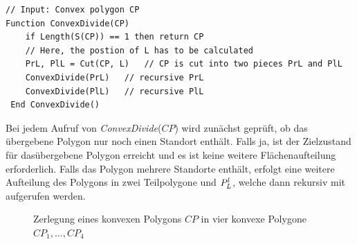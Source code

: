 \documentclass[ngerman]{seminarbeitrag}
\begin{document}
\begin{lstlisting}[float,caption={Die Grundidee hinter dem Algorithmus \con}, frame=single, label=code grundidee]
// Input: Convex polygon CP
Function ConvexDivide(CP)
    if Length(S(CP)) == 1 then return CP
    // Here, the postion of L has to be calculated
    PrL, PlL = Cut(CP, L)   // CP is cut into two pieces PrL and PlL
    ConvexDivide(PrL)   // recursive PrL
    ConvexDivide(PlL)   // recursive PlL
 End ConvexDivide() 
\end{lstlisting}

Bei jedem Aufruf von \textit{ConvexDivide}($CP$) wird zunächst geprüft, ob das übergebene Polygon nur noch einen Standort enthält. Falls ja, ist der Zielzustand für dasübergebene Polygon erreicht und es ist keine weitere Flächenaufteilung erforderlich. Falls das Polygon mehrere Standorte enthält, erfolgt eine weitere Aufteilung
des Polygons in zwei Teilpolygone \prl und $P_{L}^{l}$, welche dann rekursiv mit \con aufgerufen werden.\\

\begin{figure}[ht]
    \centering
    \caption{Zerlegung eines konvexen Polygons $CP$ in vier konvexe Polygone $CP_{1},...,CP_{4}$}
    \label{erstes beispiel}
\end{figure}
\end{document}
